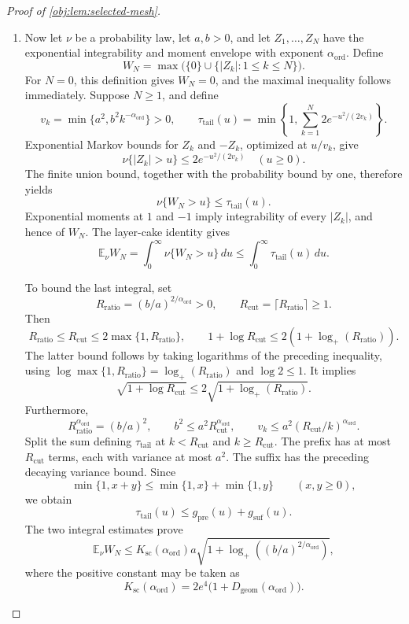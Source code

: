 \documentclass[11pt]{article}
\begin{document}
\begin{proof}[Proof of \cref{obj:lem:selected-mesh}]
\begin{enumerate}
\item Now let \(\nu\) be a probability law, let \(a,b>0\), and let
\(Z_1,\ldots,Z_N\) have the exponential integrability and moment envelope
with exponent \(\alpha_{\mathrm{ord}}\). Define
\[
W_N=\max\bigl(\{0\}\cup\{|Z_k|:1\le k\le N\}\bigr).
\]
For \(N=0\), this definition gives \(W_N=0\), and the maximal inequality
follows immediately. Suppose \(N\ge1\), and define
\[
v_k=\min\{a^2,b^2k^{-\alpha_{\mathrm{ord}}}\}>0,
\qquad
\tau_{\mathrm{tail}}(u)=\min\!\left\{1,\sum_{k=1}^{N}2e^{-u^2/(2v_k)}\right\}.
\]
Exponential Markov bounds for \(Z_k\) and \(-Z_k\), optimized at
\(u/v_k\), give
\[
\nu\{|Z_k|>u\}\le2e^{-u^2/(2v_k)}
\quad(u\ge0).
\]
The finite union bound, together with the probability bound by one,
therefore yields
\[
\nu\{W_N>u\}\le\tau_{\mathrm{tail}}(u).
\]
Exponential moments at \(1\) and \(-1\) imply integrability of every
\(|Z_k|\), and hence of \(W_N\). The layer-cake identity gives
\[
\mathbb E_\nu W_N
=
\int_0^\infty\nu\{W_N>u\}\,du
\le\int_0^\infty\tau_{\mathrm{tail}}(u)\,du.
\]

To bound the last integral, set
\[
R_{\mathrm{ratio}}=(b/a)^{2/\alpha_{\mathrm{ord}}}>0,
\qquad
R_{\mathrm{cut}}=\lceil R_{\mathrm{ratio}}\rceil\ge1.
\]
Then
\[
R_{\mathrm{ratio}}\le R_{\mathrm{cut}}
\le2\max\{1,R_{\mathrm{ratio}}\},
\qquad
1+\log R_{\mathrm{cut}}
\le2(1+\log_+(R_{\mathrm{ratio}})).
\]
The latter bound follows by taking logarithms of the preceding
inequality, using
\(\log\max\{1,R_{\mathrm{ratio}}\}
=\log_+(R_{\mathrm{ratio}})\) and \(\log2\le1\).
It implies
\[
\sqrt{1+\log R_{\mathrm{cut}}}
\le2\sqrt{1+\log_+(R_{\mathrm{ratio}})}.
\]
Furthermore,
\[
R_{\mathrm{ratio}}^{\alpha_{\mathrm{ord}}}=(b/a)^2,
\qquad
b^2\le a^2R_{\mathrm{cut}}^{\alpha_{\mathrm{ord}}},
\qquad
v_k\le a^2(R_{\mathrm{cut}}/k)^{\alpha_{\mathrm{ord}}}.
\]
Split the sum defining \(\tau_{\mathrm{tail}}\) at \(k<R_{\mathrm{cut}}\) and
\(k\ge R_{\mathrm{cut}}\). The prefix has at most \(R_{\mathrm{cut}}\)
terms, each with variance at most \(a^2\). The suffix has the preceding
decaying variance bound. Since
\[
\min\{1,x+y\}\le\min\{1,x\}+\min\{1,y\}
\qquad(x,y\ge0),
\]
we obtain
\[
\tau_{\mathrm{tail}}(u)\le g_{\mathrm{pre}}(u)+g_{\mathrm{suf}}(u).
\]
The two integral estimates prove
\[
\mathbb E_\nu W_N
\le
K_{\mathrm{sc}}(\alpha_{\mathrm{ord}})
a\sqrt{1+\log_+((b/a)^{2/\alpha_{\mathrm{ord}}})},
\]
where the positive constant may be taken as
\[
K_{\mathrm{sc}}(\alpha_{\mathrm{ord}})
=
2e^4\bigl(1+D_{\mathrm{geom}}(\alpha_{\mathrm{ord}})\bigr).
\]


\end{enumerate}
\end{proof}
\end{document}

